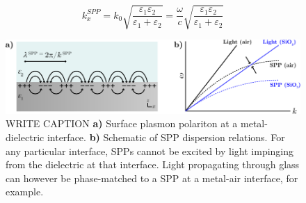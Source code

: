 \begin{equation}\label{eq:Plasmonics:SPPdispersion}
    k^{SPP}_{x} = k_0 \sqrt{\frac{\varepsilon_{1}\varepsilon_{2}}{\varepsilon_{1}+\varepsilon_{2}}} = \frac{\omega}{c} \sqrt{\frac{\varepsilon_{1}\varepsilon_{2}}{\varepsilon_{1}+\varepsilon_{2}}}
\end{equation}

\begin{figure}[htb!]
    \centering
    \includegraphics[scale=1.0]{./figures/background/plasmonics/spp.pdf}
    \caption{\label{fig:background:Plasmonics:SPP} WRITE CAPTION \textbf{a)} Surface plasmon polariton at a metal-dielectric interface. \textbf{b)} Schematic of SPP dispersion relations. For any particular interface, SPPs cannot be excited by light impinging from the dielectric at that interface. Light propagating through glass can however be phase-matched to a SPP at a metal-air interface, for example. }
\end{figure}


